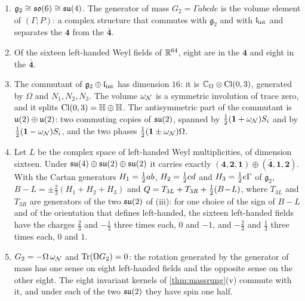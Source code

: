 \begin{theorem}
\label{thm:rung2}
\begin{enumerate}[label=(\roman*),leftmargin=2.2em,itemsep=1pt]
\item $\mathfrak g_2\cong\mathfrak{so}(6)\cong\mathfrak{su}(4)$. The generator of mass $G_2=\Gamma abcde$ is the volume element of $(\Gamma;P)$: a complex structure
that commutes with $\mathfrak g_2$ and with $\mathfrak l_{\rm int}$ and separates the $\mathbf4$ from the $\bar{\mathbf4}$.
\item Of the sixteen left-handed Weyl fields of $\mathbb{R}^{64}$, eight are in the $\mathbf4$ and eight in the $\bar{\mathbf4}$.
\item The commutant of $\mathfrak g_2\oplus\mathfrak l_{\rm int}$ has dimension $16$: it is $\mathbb{C}_\Omega\otimes\mathrm{Cl}(0,3)$, generated by $\Omega$ and
$N_1,N_2,N_3$. The volume $\omega_\mathcal N$ is a symmetric involution of trace zero, and it splits $\mathrm{Cl}(0,3)=\mathbb H\oplus\mathbb H$. The
antisymmetric part of the commutant is $\mathfrak{u}(2)\oplus\mathfrak{u}(2)$: two commuting copies of $\mathfrak{su}(2)$, spanned by $\tfrac12(\mathbf 1+\omega_\mathcal N)S_i$ and by
$\tfrac12(\mathbf 1-\omega_\mathcal N)S_i$, and the two phases $\tfrac12(\mathbf 1\pm\omega_\mathcal N)\Omega$.
\item Let $L$ be the complex space of left-handed Weyl multiplicities, of dimension sixteen. Under $\mathfrak{su}(4)\oplus\mathfrak{su}(2)\oplus\mathfrak{su}(2)$ it carries
exactly $(\mathbf4,\mathbf2,\mathbf1)\oplus(\bar{\mathbf4},\mathbf1,\mathbf2)$. With the Cartan generators $H_1=\tfrac12 ab$, $H_2=\tfrac12 cd$
and $H_3=\tfrac12 e\Gamma$ of $\mathfrak g_2$, $B\!-\!L=\pm\tfrac23(H_1+H_2+H_3)$ and $Q=T_{3L}+T_{3R}+\tfrac12(B\!-\!L)$, where $T_{3L}$ and
$T_{3R}$ are generators of the two $\mathfrak{su}(2)$ of (iii): for one choice of the sign of $B\!-\!L$ and of the orientation that defines left-handed,
the sixteen left-handed fields have the charges $\tfrac23$ and $-\tfrac13$ three times each, $0$ and $-1$, and $-\tfrac23$ and $\tfrac13$ three
times each, $0$ and $1$.
\item $G_2=-\Omega\,\omega_\mathcal N$ and $\operatorname{Tr}(\Omega G_2)=0$: the rotation generated by the generator of mass has one sense on eight left-handed
fields and the opposite sense on the other eight. The eight invariant kernels of \cref{thm:massrung}(v) commute with it, and under each of
the two $\mathfrak{su}(2)$ they have spin one half.
\end{enumerate}
\end{theorem}


